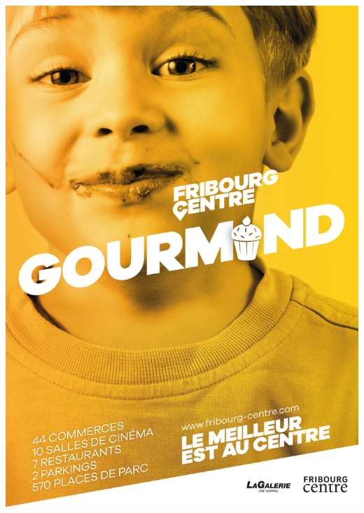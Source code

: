\clearpage%
\thispagestyle{empty}%
{\centering
\includegraphics[width=\textwidth]{fig/pub1.jpg}
\par
}

